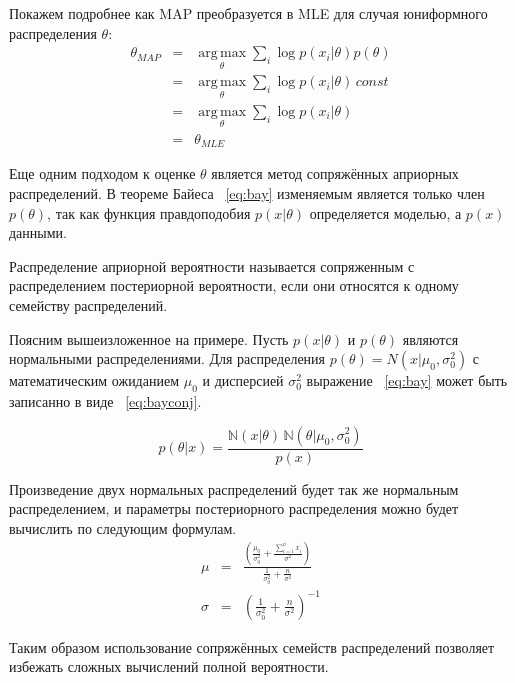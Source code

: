 Покажем подробнее как MAP преобразуется в MLE для случая юниформного распределения $\theta$:
\begin{eqnarray*} \label{eq:mapmle}
\theta_{MAP} & = &\operatorname*{arg\,max}_\theta \sum_i \log p \left( x_i \vert \theta \right) p \left( \theta \right) \\
             & = & \operatorname*{arg\,max}_\theta \sum_i \log p \left( x_i \vert \theta \right) \, const \\
             & = & \operatorname*{arg\,max}_\theta \sum_i \log p \left( x_i \vert \theta \right) \\
             & = & \theta_{MLE}
\end{eqnarray*}

Еще одним подходом к оценке $\theta$  является метод сопряжённых априорных распределений. 
В теореме Байеса ~\ref{eq:bay} изменяемым является только член $p \left( \theta \right)$, так как функция правдоподобия $p \left( x \vert \theta \right)$ определяется моделью, а $p \left(  x \right)$  данными.

Распределение априорной вероятности называется сопряженным с распределением постериорной вероятности, если они относятся к одному семейству распределений. 

Поясним вышеизложенное на примере. 
Пусть $p \left( x \vert \theta \right)$  и $p \left( \theta \right)$ являются нормальными распределениями.
Для распределения $p \left( \theta \right) = N(x \vert \mu_0,\sigma_0^2)$  с математическим ожиданием $\mu_0$ и дисперсией $\sigma_0^2$ выражение ~\ref{eq:bay} может быть записанно в виде ~\ref{eq:bayconj}.

\begin{equation} \label{eq:bayconj}
p \left( \theta \vert  x \right) = \frac{\mathbb{N}(x \vert \theta ) \, \mathbb{N}(\theta \vert \mu_0 , \sigma_0^2)} {p \left(  x \right)}
\end{equation}

Произведение двух нормальных распределений будет так же нормальным распределением, и параметры постериорного распределения можно будет вычислить по следующим формулам.
\begin{eqnarray}
\label{eq:bayconj1}
\mu & = & \frac{\left( \frac{\mu_0}{\sigma_0^2} + \frac{\sum_{i=1}^n x_i}{\sigma^2}\right)} { \frac{1}{\sigma_0^2}+ \frac{n}{\sigma^2} }\\
\sigma & = & \left( \frac{1}{\sigma_0^2} + \frac{n}{\sigma^2}\right)^{-1}
\end{eqnarray}

Таким образом использование сопряжённых семейств распределений позволяет избежать сложных вычислений полной вероятности.

